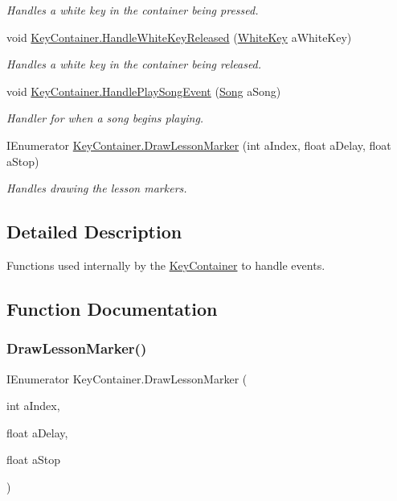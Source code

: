 \begin{DoxyCompactItemize}
\begin{DoxyCompactList}\small\item\em Handles a white key in the container being pressed. \end{DoxyCompactList}\item 
void \hyperlink{group___key_contain_event_handlers_ga5b98b0105300225fd79638525ad3cb3c}{Key\+Container.\+Handle\+White\+Key\+Released} (\hyperlink{class_white_key}{White\+Key} a\+White\+Key)
\begin{DoxyCompactList}\small\item\em Handles a white key in the container being released. \end{DoxyCompactList}\item 
void \hyperlink{group___key_contain_event_handlers_ga894c823059c5268af0954f83c04036ed}{Key\+Container.\+Handle\+Play\+Song\+Event} (\hyperlink{class_song}{Song} a\+Song)
\begin{DoxyCompactList}\small\item\em Handler for when a song begins playing. \end{DoxyCompactList}\item 
I\+Enumerator \hyperlink{group___key_contain_event_handlers_gac6b82feca83eaf5e3ce6901088bc552c}{Key\+Container.\+Draw\+Lesson\+Marker} (int a\+Index, float a\+Delay, float a\+Stop)
\begin{DoxyCompactList}\small\item\em Handles drawing the lesson markers. \end{DoxyCompactList}\end{DoxyCompactItemize}


\subsection{Detailed Description}
Functions used internally by the \hyperlink{class_key_container}{Key\+Container} to handle events. 

\subsection{Function Documentation}
\mbox{\label{group___key_contain_event_handlers_gac6b82feca83eaf5e3ce6901088bc552c}} 
\subsubsection{\texorpdfstring{Draw\+Lesson\+Marker()}{DrawLessonMarker()}}
{\footnotesize\ttfamily I\+Enumerator Key\+Container.\+Draw\+Lesson\+Marker (\begin{DoxyParamCaption}\item[{int}]{a\+Index,  }\item[{float}]{a\+Delay,  }\item[{float}]{a\+Stop }\end{DoxyParamCaption})\hspace{0.3cm}{\ttfamily [private]}}



